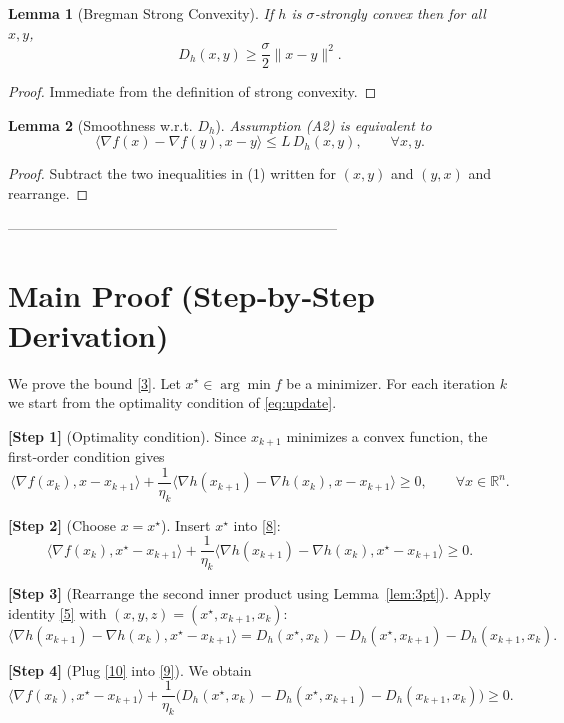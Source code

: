 \documentclass{article}
\newtheorem{lemma}{Lemma}
\newcommand{\R}{\mathbb{R}}
\newcommand{\inner}[2]{\langle #1,#2\rangle}
\newcommand{\D}[2]{D_{h}(#1,#2)}
\newcommand{\grad}{\nabla}
\begin{document}
\begin{lemma}[Bregman Strong Convexity]\label{lem:strong}
If $h$ is $\sigma$‑strongly convex then for all $x,y$,
\[
\D{x}{y}\ge\frac{\sigma}{2}\|x-y\|^{2}. \tag{6}
\]
\end{lemma}
\begin{proof}
Immediate from the definition of strong convexity. \hfill\qedsymbol
\end{proof}

\begin{lemma}[Smoothness w.r.t. $D_h$]\label{lem:smooth}
Assumption (A2) is equivalent to
\[
\inner{\grad f(x)-\grad f(y)}{x-y}\le L\,\D{x}{y},\qquad\forall x,y. \tag{7}
\]
\end{lemma}
\begin{proof}
Subtract the two inequalities in (1) written for $(x,y)$ and $(y,x)$ and rearrange. \hfill\qedsymbol
\end{proof}

-----------------------------------------------------------------------

\section*{Main Proof (Step‑by‑Step Derivation)}
We prove the bound \eqref{3}.  
Let $x^{\star}\in\arg\min f$ be a minimizer. For each iteration $k$ we start from the optimality condition of \eqref{eq:update}.

\medskip
\noindent\textbf{[Step 1]} (Optimality condition).  
Since $x_{k+1}$ minimizes a convex function, the first‑order condition gives
\[
\inner{\grad f(x_k)}{x-x_{k+1}}+\frac{1}{\eta_k}\inner{\grad h(x_{k+1})-\grad h(x_k)}{x-x_{k+1}}\ge0,
\qquad\forall x\in\R^{n}. \tag{8}
\]

\noindent\textbf{[Step 2]} (Choose $x=x^{\star}$).  
Insert $x^{\star}$ into \eqref{8}:
\[
\inner{\grad f(x_k)}{x^{\star}-x_{k+1}}+\frac{1}{\eta_k}\inner{\grad h(x_{k+1})-\grad h(x_k)}{x^{\star}-x_{k+1}}\ge0. \tag{9}
\]

\noindent\textbf{[Step 3]} (Rearrange the second inner product using Lemma~\ref{lem:3pt}).  
Apply identity \eqref{5} with $(x,y,z)=(x^{\star},x_{k+1},x_k)$:
\[
\inner{\grad h(x_{k+1})-\grad h(x_k)}{x^{\star}-x_{k+1}}
= \D{x^{\star}}{x_k}-\D{x^{\star}}{x_{k+1}}-\D{x_{k+1}}{x_k}. \tag{10}
\]

\noindent\textbf{[Step 4]} (Plug \eqref{10} into \eqref{9}).  
We obtain
\[
\inner{\grad f(x_k)}{x^{\star}-x_{k+1}}
+\frac{1}{\eta_k}\Big(\D{x^{\star}}{x_k}-\D{x^{\star}}{x_{k+1}}-\D{x_{k+1}}{x_k}\Big)\ge0.
\tag{11}
\]
\end{document}
